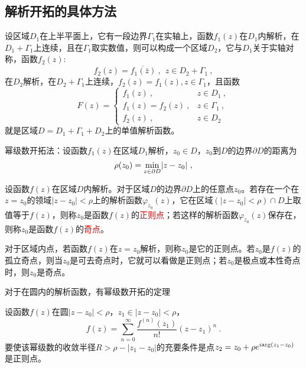 \documentclass[12pt,a4paper]{article}
\begin{document}
\subsection{解析开拓的具体方法}

\begin{tcolorbox}[colback=green!5,colframe=green!40!black,title= 黎曼-施瓦茨对称定理]
设区域$D_1$在上半平面上，它有一段边界$\Gamma_1$在实轴上，函数$f_1(z)$在$D_1$内解析，在$D_1 +\Gamma_{1}$上连续，且在$\Gamma_1$取实数值，则可以构成一个区域$D_2$，它与$D_1$关于实轴对称，函数$f_2(z)$:
\begin{equation}
f_2(z) = \overline{f_1(\bar{z})} ~, ~~ z \in D_2 + \Gamma_1 ~,
\end{equation}
在$D_2$解析，在$D_2 +\Gamma_{1}$上连续，$f_2(z) = f_1(z), z \in \Gamma_1$，且函数
\begin{equation}
F(z) = \begin{cases}
f_1(z) ~, & z \in D_1 ~, \\
f_1(z) = f_2(z) ~, & z \in \Gamma_{1} ~, \\ 
f_2(z) ~, &z \in D_2
\end{cases}
\end{equation}
就是区域$D = D_1 +\Gamma_{1} +D_2$上的单值解析函数。
\end{tcolorbox}



幂级数开拓法：设函数$f_1(z)$在区域$D_1$解析，$z_0 \in D$，$z_0$到$D$的边界$\partial D$的距离为
\begin{equation*}
\rho(z_0) = \underset{z \in \partial D}{\rm min} |z-z_0| ~,
\end{equation*}





\begin{tcolorbox}[colback=green!5,colframe=green!40!black,title= 定义]
设函数$f(z)$在区域$D$内解析。对于区域$D$的边界$\partial D$上的任意点$z_0$。若存在一个在$z=z_0$的领域$|z-z_0| < \rho$上的解析函数$\varphi_{z_0}(z)$，它在区域$(|z-z_0| < \rho) \cap D$上取值等于$f(z)$，则称$z_0$是函数$f(z)$的\textcolor{red}{正则点}；若这样的解析函数$\varphi_{z_0}(z)$保存在，则称$z_0$是函数$f(z)$的\textcolor{red}{奇点}。
\end{tcolorbox}


对于区域内点，若函数$f(z)$在$z=z_0$解析，则称$z_0$是它的正则点。若$z_0$是$f(z)$的孤立奇点，则当$z_0$是可去奇点时，它就可以看做是正则点；若$z_0$是极点或本性奇点时，则$z_0$是奇点。


对于在圆内的解析函数，有幂级数开拓的定理
\begin{tcolorbox}[colback=green!5,colframe=green!40!black,title= 定义]
设函数$f(z)$在圆$|z-z_0| < \rho$，$z_1 \in |z-z_0| < \rho$，
\begin{equation}
f(z) = \sum\limits_{n=0}^\infty \dfrac{f^{(n)}(z_1)}{n!} (z-z_1)^n ~.
\end{equation}
要使该幂级数的收敛半径$R > \rho - |z_1 -z_0|$的充要条件是点$z_2 = z_0 + \rho e^{i {\rm arg}(z_1 -z_0)}$是正则点。
\end{tcolorbox}
\end{document}
